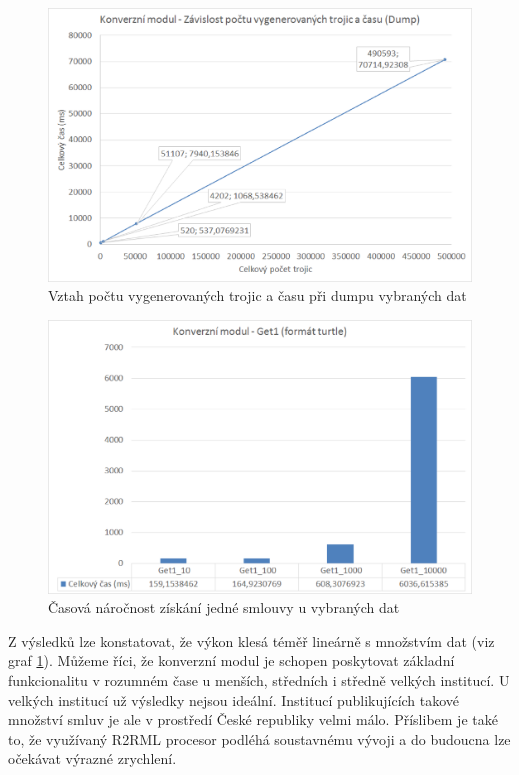 \begin{figure}[H]
\centerline{\includegraphics[width=\textwidth]{img/graphDump2.eps}}
\caption{Vztah počtu vygenerovaných trojic a času při dumpu vybraných dat}
\label{obr:graphDump2}
\end{figure}

\begin{figure}[H]
\centerline{\includegraphics[width=\textwidth]{img/graphGet1.eps}}
\caption{Časová náročnost získání jedné smlouvy u vybraných dat}
\label{obr:graphGet1}
\end{figure}

\newpage
Z výsledků lze konstatovat, že výkon klesá téměř lineárně s množstvím dat (viz graf \ref{obr:graphDump2}). Můžeme říci, že konverzní modul je schopen poskytovat základní funkcionalitu v rozumném čase u menších, středních i středně velkých institucí. U velkých institucí už výsledky nejsou ideální. Institucí publikujících takové množství smluv je ale v prostředí České republiky velmi málo. Příslibem je také to, že využívaný R2RML procesor podléhá soustavnému vývoji a do budoucna lze očekávat výrazné zrychlení.


